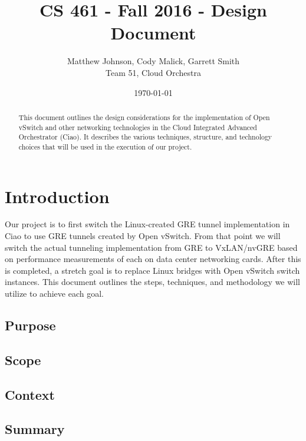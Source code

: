 \documentclass[10pt,letterpaper,onecolumn,journal]{IEEEtran}
\begin{document}
\begin{titlepage}
	\title{CS 461 - Fall 2016 - Design Document}
	\author{Matthew Johnson, Cody Malick, Garrett Smith\\
		Team 51, Cloud Orchestra}
	\date{\today}
	\maketitle
	\vspace{4cm}
	\begin{abstract}
		\noindent This document outlines the design considerations for
		the implementation of Open vSwitch and other networking
		technologies in the Cloud Integrated Advanced Orchestrator
		(Ciao). It describes the various techniques, structure, and
		technology choices that will be used in the execution of our
		project.
	\end{abstract}

\end{titlepage}
\tableofcontents
\clearpage

\section{Introduction}

Our project is to first switch the Linux-created GRE tunnel implementation in
Ciao to use GRE tunnels created by Open vSwitch. From that point we will switch
the actual tunneling implementation from GRE to VxLAN/nvGRE based on performance
measurements of each on data center networking cards. After this is completed, a
stretch goal is to replace Linux bridges with Open vSwitch switch instances.
This document outlines the steps, techniques, and methodology we will utilize to
achieve each goal.
\subsection{Purpose}
\subsection{Scope}
\subsection{Context}
\subsection{Summary}



\end{document}
